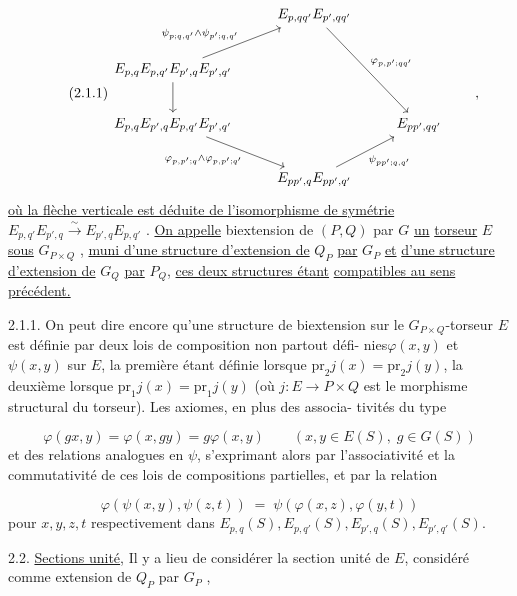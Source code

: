 \begin{equation}\tag{2.1.1}
\begin{tikzcd}[column sep=1.2em, row sep=2.2em]
 & & E_{p,qq'}E_{p',qq'} \arrow[rrdd, "{\varphi_{p,p';qq'}}"] & & \\
E_{p,q}E_{p,q'}E_{p',q}E_{p',q'} \arrow[rru, "{\psi_{p;q,q'}\wedge\psi_{p';q,q'}}"] \arrow[d] & & & & \\
E_{p,q}E_{p',q}E_{p,q'}E_{p',q'} \arrow[rrd, "{\varphi_{p,p';q}\wedge\varphi_{p,p';q'}}"'] & & & & E_{pp',qq'} \\
 & & E_{pp',q}E_{pp',q'} \arrow[rru, "{\psi_{pp';q,q'}}"'] & &
\end{tikzcd}
\qquad ,
\end{equation}
\underline{où la flèche verticale est déduite de l'isomorphisme de symétrie}
$E_{p,q'}E_{p',q} \overset{\sim}{\longrightarrow} E_{p',q}E_{p,q'}$ . \underline{On appelle} biextension de $(P,Q)$ par $G$ \underline{un}
\underline{torseur} $E$ \underline{sous} $G_{P\times Q}$ , \underline{muni d'une structure d'extension de} $Q_P$ \underline{par} $G_P$ \underline{et}
\underline{d'une structure d'extension de} $G_Q$ \underline{par} $P_Q$, \underline{ces deux structures étant}
\underline{compatibles au sens précédent.}



2.1.1.  On peut dire encore qu'une structure de biextension sur le
$G_{P\times Q}$-torseur $E$ est définie par deux lois de composition non partout défi-
nies$\varphi(x,y)$ et $\psi(x,y)$ sur $E$, la première étant définie lorsque
$\mathrm{pr}_2 j(x) = \mathrm{pr}_2 j(y)$, la deuxième lorsque $\mathrm{pr}_1 j(x) = \mathrm{pr}_1 j(y)$ (où $j : E \to P\times Q$
est le morphisme structural du torseur). Les axiomes, en plus des associa-
tivités du type

\begin{equation}\tag{2.1.1.1}
\varphi(gx,y) = \varphi(x,gy) = g\varphi(x,y) \qquad (x,y \in E(S), \; g \in G(S))
\end{equation}
et des relations analogues en $\psi$, s'exprimant alors par l'associativité
et la commutativité de ces lois de compositions partielles, et par la
relation

\begin{equation}\tag{2.1.1.2}
\varphi(\psi(x,y),\psi(z,t)) \;=\; \psi(\varphi(x,z),\varphi(y,t))
\end{equation}
pour $x,y,z,t$ respectivement dans $E_{p,q}(S),E_{p,q'}(S),E_{p',q}(S),E_{p',q'}(S)$.

2.2.  \underline{Sections unité}, Il y a lieu de considérer la section unité de $E$,
considéré comme extension de $Q_P$ par $G_P$ ,

